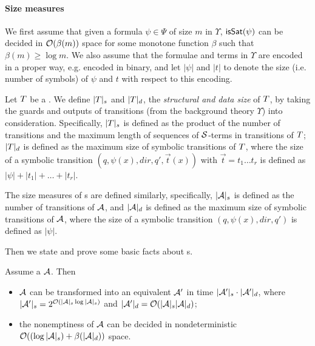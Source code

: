 \paragraph{Size measures}
We first assume that given a formula $\psi \in \Psi$ of size $m$ in $\Upsilon$, $\mathsf{isSat}(\psi)$ can be decided in $\mathcal{O}(\beta(m))$ space for some monotone function $\beta$ such that $\beta(m) \ge \log m$. We also assume that the formulae and terms in $\Upsilon$ are encoded in a proper way, e.g. encoded in binary,  and let $|\psi|$  and $|t|$ to denote the size (i.e. number of symbols) of $\psi$ and $t$ with respect to this encoding.

Let $T$ be a \SSPT{}. We define $|T|_s$ and $|T|_d$, the \emph{structural and data size} of $T$, by taking the guards and outputs of transitions (from the background theory $\Upsilon$) into consideration. Specifically, $|T|_s$ is defined as the product of the number of transitions and the maximum length of sequences of $\mathcal{S}$-terms in  transitions of $T$; 
$|T|_d$ is defined as the maximum size of symbolic transitions of $T$, where the size of a symbolic transition $(q, \psi(x), dir, q', \vec{t}(x))$ with $\vec{t}=t_1 \ldots t_r$ is defined as $|\psi| + |t_1| + \ldots + |t_r|$.

The size measures of \SSA{}s are defined similarly, specifically, $|\mathcal{A}|_s$  is  defined as the number of transitions of $\mathcal{A}$, and $|\mathcal{A}|_d$ is defined as the maximum size of symbolic transitions of $\mathcal{A}$, where the size of a symbolic transition $(q, \psi(x), dir, q')$ is defined as $|\psi|$. 

Then we state and prove some basic facts about \SSA{}s.
\begin{proposition}\label{prop-2nsa}
Assume a \SSA{}  $\mathcal{A}$. Then
\begin{itemize}
\item $\mathcal{A}$ can be  transformed into an equivalent \SA{} $\mathcal{A}'$ in time $|\mathcal{A}'|_s \cdot |\mathcal{A}'|_d$, where $|\mathcal{A}'|_s = 2^{\mathcal{O}\left(|\mathcal{A}|_s \log |\mathcal{A}|_s\right)}$ and $|\mathcal{A}'|_d = \mathcal{O}(|\mathcal{A}|_s |\mathcal{A}|_d)$;
%
%
%
\item the nonemptiness of $\mathcal{A}$ can be decided in nondeterministic $\mathcal{O}( (\log |\mathcal{A}|_s) + \beta(|\mathcal{A}|_d))$ space.
\end{itemize}
\end{proposition}



